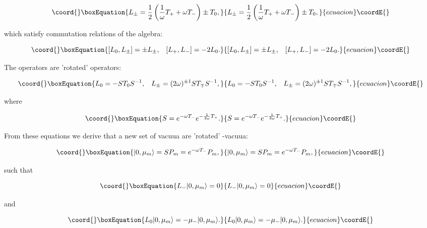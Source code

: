\documentclass[a4paper,preprint,aps]{revtex4}
\begin{document}
\begin{equation}\coord{}\boxEquation{
	L_{\pm}=\frac{1}{2}
	\left(
	\frac{1}{\omega}T_{+}+\omega T_{-}
	\right)
	\pm T_{0},
}{
	L_{\pm}=\frac{1}{2}
	\left(
	\frac{1}{\omega}T_{+}+\omega T_{-}
	\right)
	\pm T_{0},
}{ecuacion}\coordE{}\end{equation}

which satisfy commutation relations of the \coordHE{} algebra:


\begin{equation}\coord{}\boxEquation{
	[L_{0},L_{\pm}]=\pm L_{\pm},\;\;\; [L_{+},L_{-}]=-2L_{0}.
}{
	[L_{0},L_{\pm}]=\pm L_{\pm},\;\;\; [L_{+},L_{-}]=-2L_{0}.
}{ecuacion}\coordE{}\end{equation}

 The \coordHE{} operators are 'rotated' \coordHE{} operators:


\begin{equation}\coord{}\boxEquation{
	L_{0}=-ST_{0}S^{-1},\;\;\; L_{\pm}=(2\omega)^{\pm 1} ST_{\mp}S^{-1}, 
}{
	L_{0}=-ST_{0}S^{-1},\;\;\; L_{\pm}=(2\omega)^{\pm 1} ST_{\mp}S^{-1}, 
}{ecuacion}\coordE{}\end{equation}

where  

\begin{equation}\coord{}\boxEquation{
	S=e^{-\omega T_{-}} e^{-\frac{1}{2 \omega} T_{+}}.
}{
	S=e^{-\omega T_{-}} e^{-\frac{1}{2 \omega} T_{+}}.
}{ecuacion}\coordE{}\end{equation}

From these equations we derive that a new set of vacuua are 'rotated'
 \coordHE{}-vacuua:


\begin{equation}\coord{}\boxEquation{
	|0,\mu_{m}\rangle = SP_{m} = e^{-\omega T_{-}} P_{m},
}{
	|0,\mu_{m}\rangle = SP_{m} = e^{-\omega T_{-}} P_{m},
}{ecuacion}\coordE{}\end{equation}

such that


\begin{equation}\coord{}\boxEquation{
	L_{-}|0,\mu_{m}\rangle =0
}{
	L_{-}|0,\mu_{m}\rangle =0
}{ecuacion}\coordE{}\end{equation}

and

\begin{equation}\coord{}\boxEquation{
	L_{0}|0,\mu_{m}\rangle =-\mu_{-}|0,\mu_{m}\rangle .
}{
	L_{0}|0,\mu_{m}\rangle =-\mu_{-}|0,\mu_{m}\rangle .
}{ecuacion}\coordE{}\end{equation}
\end{document}
